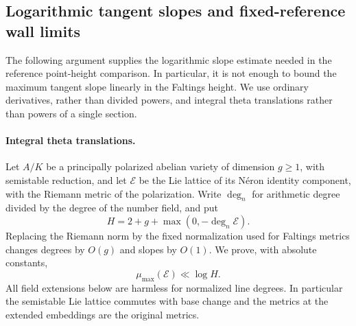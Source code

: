 \subsection{Logarithmic tangent slopes and fixed-reference wall limits}
\label{sec:logarithmic-wall-heights}

The following argument supplies the logarithmic slope estimate needed
in the reference point-height comparison. In particular, it is not
enough to bound the maximum tangent slope linearly in the Faltings
height. We use ordinary derivatives, rather than divided powers, and
integral theta translations rather than powers of a single section.

\paragraph{Integral theta translations.}
Let \(A/K\) be a principally polarized abelian variety of dimension
\(g\ge1\), with semistable reduction, and let \(\mathcal E\) be the Lie
lattice of its N\'eron identity component, with the Riemann metric
of the polarization. Write \(\deg_n\) for arithmetic degree divided
by the degree of the number field, and put
\[
 H=2+g+\max(0,-\deg_n\mathcal E).
\]
Replacing the Riemann norm by the fixed normalization used for
Faltings metrics changes degrees by \(O(g)\) and slopes by \(O(1)\).
We prove, with absolute constants,
\[
                 \mu_{\max}(\mathcal E)\ll\log H.       \tag{LW1}
\]
All field extensions below are harmless for normalized line degrees.
In particular the semistable Lie lattice commutes with base change
and the metrics at the extended embeddings are the original metrics.

